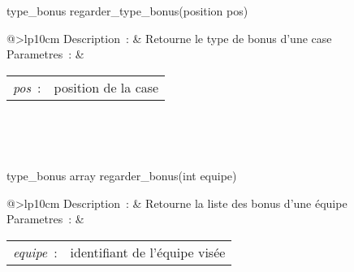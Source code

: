 \begin{minipage}{\linewidth}

\begin{lst-c++}
type_bonus regarder_type_bonus(position pos)
\end{lst-c++}

\noindent
\begin{tabular}[t]{@{\extracolsep{0pt}}>{\bfseries}lp{10cm}}
Description~: & Retourne le type de bonus d'une case \\


Parametres~: &
\begin{tabular}[t]{@{\extracolsep{0pt}}ll}
    
    
      
        \textsl{pos}~: & position de la case \\
      
    
  \end{tabular} \\






\end{tabular} \\[0.3cm]
\end{minipage}


\begin{minipage}{\linewidth}

\begin{lst-c++}
type_bonus array regarder_bonus(int equipe)
\end{lst-c++}

\noindent
\begin{tabular}[t]{@{\extracolsep{0pt}}>{\bfseries}lp{10cm}}
Description~: & Retourne la liste des bonus d'une équipe \\


Parametres~: &
\begin{tabular}[t]{@{\extracolsep{0pt}}ll}
    
    
      
        \textsl{equipe}~: & identifiant de l'équipe visée \\
      
    
  \end{tabular} \\






\end{tabular} \\[0.3cm]
\end{minipage}


